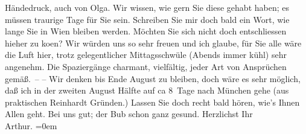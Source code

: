 \begin{ledgroupsized}[t]{13cm}
               Händedruck, auch von Olga. Wir wissen, wie gern
               Sie diese \label{K_L01862-1v}\label{K_L01862-1h} gehabt haben; es müssen traurige
               Tage für Sie sein. Schreiben Sie mir doch bald ein Wort, {\pb}wie lange Sie in Wien bleiben werden. Möchten Sie sich nicht doch entschliessen hieher zu
                  ko{\geminationm}en? Wir würden uns so sehr freuen und ich glaube,
               für Sie alle wäre die Luft hier, trotz gelegentlicher Mittagsschwüle (Abends immer
               kühl) sehr angenehm. Die Spaziergänge charmant, vielfältig, jeder {\pb}Art von Ansprüchen gemäß. –\pend
           \pstart
           – Wir denken bis Ende August zu bleiben, doch wäre es sehr möglich, daß
               ich in der zweiten August Hälfte auf ca 8 Tage nach München gehe (aus praktischen Reinhardt Gründen.)\pend
           \pstart
           Lassen Sie doch recht bald hören, wie’s Ihnen Allen geht. Bei uns gut; der Bub schon {\pb}ganz gesund.\pend
           \pstart
           Herzlichst Ihr{\\[\baselineskip]}\spacefill\mbox{Arthur.}\pend
           \leftskip=0em{}
         
         \endnumbering{}\end{ledgroupsized}  \newcommand{\dateiname}{L01862}\newcommand{\titel}{Arthur Schnitzler an Richard Beer-Hofmann, 31. 7. 1909}\newcommand{\editorInnen}{Martin Anton Müller und Gerd-Hermann Susen}
      